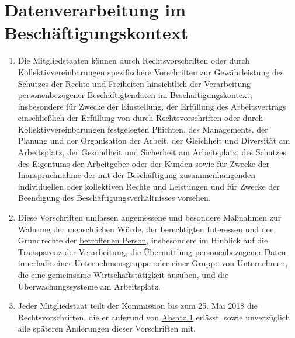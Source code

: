 \chapter{Datenverarbeitung im Beschäftigungskontext}
\label{ch:88}


\begin{enumerate}

  \item Die Mitgliedstaaten können durch Rechtsvorschriften oder durch Kollektivvereinbarungen spezifischere
   Vorschriften zur Gewährleistung des Schutzes der Rechte und Freiheiten hinsichtlich der \hyperref[itm:04-2]{Verarbeitung}
   \hyperref[itm:04-1]{personenbezogener Beschäftigtendaten} im Beschäftigungskontext, insbesondere für Zwecke der Einstellung, der
   Erfüllung des Arbeitsvertrags einschließlich der Erfüllung von durch Rechtsvorschriften oder durch
   Kollektivvereinbarungen festgelegten Pflichten, des Managements, der Planung und der Organisation der Arbeit, der
   Gleichheit und Diversität am Arbeitsplatz, der Gesundheit und Sicherheit am Arbeitsplatz, des Schutzes des Eigentums
   der Arbeitgeber oder der Kunden sowie für Zwecke der Inanspruchnahme der mit der Beschäftigung zusammenhängenden
   individuellen oder kollektiven Rechte und Leistungen und für Zwecke der Beendigung des Beschäftigungsverhältnisses
   vorsehen.
  \label{itm:88-1}

  \item Diese Vorschriften umfassen angemessene und besondere Maßnahmen zur Wahrung der menschlichen Würde, der
   berechtigten Interessen und der Grundrechte der \hyperref[itm:04-1]{betroffenen Person}, insbesondere im Hinblick auf die Transparenz der
   \hyperref[itm:04-2]{Verarbeitung}, die Übermittlung \hyperref[itm:04-1]{personenbezogener Daten} innerhalb einer Unternehmensgruppe oder einer Gruppe von
   Unternehmen, die eine gemeinsame Wirtschaftstätigkeit ausüben, und die Überwachungssysteme am Arbeitsplatz.
  \label{itm:88-2}

  \item Jeder Mitgliedstaat teilt der Kommission bis zum 25. Mai 2018 die Rechtsvorschriften, die er aufgrund von
   \hyperref[itm:88-1]{Absatz 1} erlässt, sowie unverzüglich alle späteren Änderungen dieser Vorschriften mit.
  \label{itm:88-3}

\end{enumerate}


